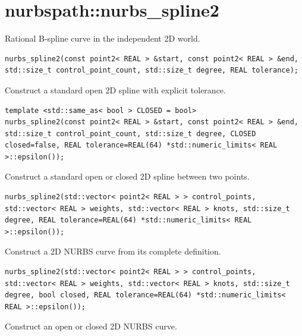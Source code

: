 \section{nurbspath::nurbs\_spline2}
Rational B-spline curve in the independent 2D world.
\par\noindent\begin{minipage}{\linewidth}
\begin{lstlisting}[style=apireference]
nurbs_spline2(const point2< REAL > &start, const point2< REAL > &end, std::size_t control_point_count, std::size_t degree, REAL tolerance);
\end{lstlisting}
{\footnotesize Construct a standard open 2D spline with explicit tolerance.\par}
\end{minipage}\par\vspace{1pt}
\par\noindent\begin{minipage}{\linewidth}
\begin{lstlisting}[style=apireference]
template <std::same_as< bool > CLOSED = bool>
nurbs_spline2(const point2< REAL > &start, const point2< REAL > &end, std::size_t control_point_count, std::size_t degree, CLOSED closed=false, REAL tolerance=REAL(64) *std::numeric_limits< REAL >::epsilon());
\end{lstlisting}
{\footnotesize Construct a standard open or closed 2D spline between two points.\par}
\end{minipage}\par\vspace{1pt}
\par\noindent\begin{minipage}{\linewidth}
\begin{lstlisting}[style=apireference]
nurbs_spline2(std::vector< point2< REAL > > control_points, std::vector< REAL > weights, std::vector< REAL > knots, std::size_t degree, REAL tolerance=REAL(64) *std::numeric_limits< REAL >::epsilon());
\end{lstlisting}
{\footnotesize Construct a 2D NURBS curve from its complete definition.\par}
\end{minipage}\par\vspace{1pt}
\par\noindent\begin{minipage}{\linewidth}
\begin{lstlisting}[style=apireference]
nurbs_spline2(std::vector< point2< REAL > > control_points, std::vector< REAL > weights, std::vector< REAL > knots, std::size_t degree, bool closed, REAL tolerance=REAL(64) *std::numeric_limits< REAL >::epsilon());
\end{lstlisting}
{\footnotesize Construct an open or closed 2D NURBS curve.\par}
\end{minipage}\par\vspace{1pt}
